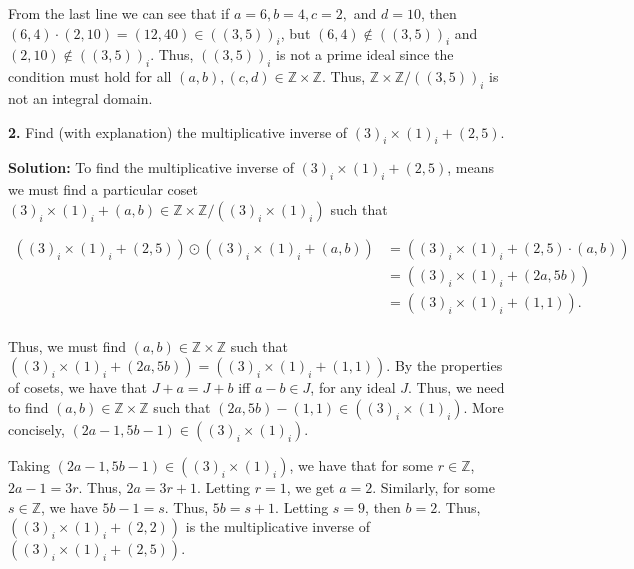 \documentclass[12pt, a4paper]{article}
\begin{document}
\vspace{2mm}
    
\noindent From the last line we can see that if $a=6, b=4, c=2,$ and $d=10$, then $(6,4)\cdot(2,10)=(12,40)\in((3,5))_i$, but $(6,4)\notin((3,5))_i$ and $(2,10)\notin((3,5))_i$. Thus, $((3,5))_i$ is not a prime ideal since the condition must hold for all $(a,b),(c,d)\in\mathbb{Z}\times\mathbb{Z}$. Thus, $\mathbb{Z}\times\mathbb{Z}/((3,5))_i$ is not an integral domain.

\vspace{6mm}

\noindent\textbf{2.} Find (with explanation) the multiplicative inverse of $(3)_i\times(1)_i+(2,5)$.

\vspace{4mm}

\noindent\textbf{Solution:} To find the multiplicative inverse of $(3)_i\times(1)_i+(2,5)$, means we must find a particular coset $(3)_i\times(1)_i+(a,b)\in\mathbb{Z}\times\mathbb{Z}/((3)_i\times(1)_i)$ such that\par

     \begin{equation*}
        \begin{split}
            ((3)_i\times(1)_i+(2,5))\odot((3)_i\times(1)_i+(a,b)) &= ((3)_i\times(1)_i+(2,5)\cdot(a,b)) \\
            & = ((3)_i\times(1)_i+(2a,5b)) \\
            & = ((3)_i\times(1)_i+(1,1)). \\
        \end{split}
    \end{equation*}
    
\newpage

\par Thus, we must find $(a,b)\in\mathbb{Z}\times\mathbb{Z}$ such that $((3)_i\times(1)_i+(2a,5b))=((3)_i\times(1)_i+(1,1))$. By the properties of cosets, we have that $J+a=J+b$ iff $a-b\in J$, for any ideal $J$. Thus, we need to find $(a,b)\in\mathbb{Z}\times\mathbb{Z}$ such that $(2a,5b)-(1,1)\in((3)_i\times(1)_i)$. More concisely, $(2a-1,5b-1)\in((3)_i\times(1)_i)$.\par
Taking $(2a-1,5b-1)\in((3)_i\times(1)_i)$, we have that for some $r\in\mathbb{Z}$, $2a-1=3r$. Thus, $2a=3r+1$. Letting $r=1$, we get $a=2$. Similarly, for some $s\in\mathbb{Z}$, we have $5b-1=s$. Thus, $5b=s+1$. Letting $s=9$, then $b=2$. Thus,  $((3)_i\times(1)_i+(2,2))$ is the multiplicative inverse of $((3)_i\times(1)_i+(2,5))$. 
 
\end{document}
